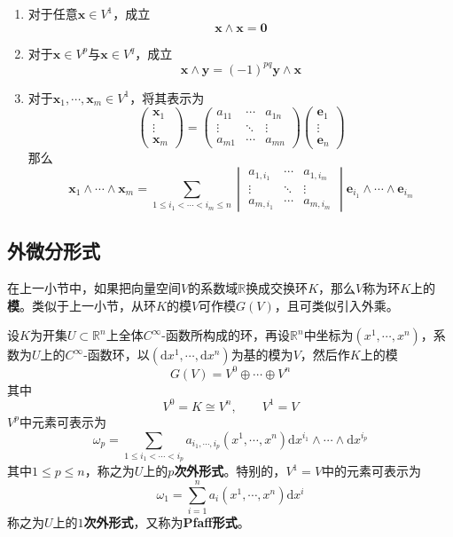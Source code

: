 \documentclass[lang = cn, scheme = chinese, thmcnt = section]{elegantbook}
\newcommand{\R}{\mathbb{R}}            %
\newcommand{\sub}{\subset}             %
\newcommand{\bs}{\boldsymbol}          %
\newcommand{\dd}{\mathrm{d}}           %
\begin{document}
\begin{theorem}
	\begin{enumerate}
		\item 对于任意$\bs{x}\in V^1$，成立%
		$$
		\bs{x}\wedge\bs{x}=\bs{0}
		$$
		\item 对于$\bs{x}\in V^p$与$\bs{x}\in V^q$，成立%
		$$
		\bs{x}\wedge\bs{y}=(-1)^{pq}\bs{y}\wedge\bs{x}
		$$
		\item 对于$\bs{x}_1,\cdots,\bs{x}_m\in V^1$，将其表示为%
		$$
		\begin{pmatrix}
			\bs{x}_1\\\vdots\\\bs{x}_m
		\end{pmatrix}
		=\begin{pmatrix}
			a_{11} & \cdots & a_{1n}\\
			\vdots & \ddots & \vdots\\
			a_{m1} & \cdots & a_{mn}
		\end{pmatrix}
		\begin{pmatrix}
			\bs{e}_1\\\vdots\\\bs{e}_n
		\end{pmatrix}
		$$
		那么%
		$$
		\bs{x}_1\wedge\cdots\wedge\bs{x}_m
		=\sum_{1\le i_1<\cdots<i_m\le n}
		\begin{vmatrix}
			a_{1,i_1} & \cdots & a_{1,i_m}\\
			\vdots & \ddots & \vdots\\
			a_{m,i_1} & \cdots & a_{m,i_m}
		\end{vmatrix}
		\bs{e}_{i_1}\wedge\cdots\wedge\bs{e}_{i_m}
		$$
	\end{enumerate}
\end{theorem}

\subsection{外微分形式}

在上一小节中，如果把向量空间$V$的系数域$\R$换成交换环$K$，那么$V$称为环$K$上的\textbf{模}。类似于上一小节，从环$K$的模$V$可作模$G(V)$，且可类似引入外乘。

设$K$为开集$U\sub\R^n$上全体$C^\infty$-函数所构成的环，再设$\R^n$中坐标为$(x^1,\cdots,x^n)$，系数为$U$上的$C^\infty$-函数环，以$(\dd x^1,\cdots,\dd x^n)$为基的模为$V$，然后作$K$上的模%
$$
G(V)=V^0\oplus\cdots\oplus V^n
$$
其中%
$$
V^0=K\cong V^n,\qquad V^1=V
$$
$V^p$中元素可表示为%
$$
\omega_p=\sum_{1\le i_1<\cdots<i_p}a_{i_1,\cdots,i_p}(x^1,\cdots,x^n)\dd x^{i_1}\wedge\cdots\wedge\dd x^{i_p}
$$
其中$1\le p \le n$，称之为$U$上的\textbf{$p$次外形式}。特别的，$V^1=V$中的元素可表示为%
$$
\omega_1=\sum_{i=1}^{n}a_i(x^1,\cdots,x^n)\dd x^{i}
$$
称之为$U$上的\textbf{$1$次外形式}，又称为\textbf{Pfaff形式}。
\end{document}
